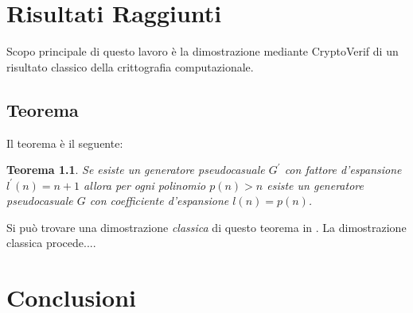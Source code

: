 \documentclass[a4paper,openright,twoside,12pt]{report}
\newtheorem{teorema}{Teorema}[chapter]
\begin{document}
\chapter{Risultati Raggiunti}
Scopo principale di questo lavoro \`e la dimostrazione mediante CryptoVerif di un risultato classico della crittografia computazionale.
\section{Teorema}
Il teorema \`e il seguente:\\
\begin{teorema}
Se esiste un generatore pseudocasuale $G^{'}$ con fattore d'espansione $l^{'}(n)=n+1$ allora per ogni polinomio $p(n)>n$ esiste un generatore pseudocasuale $G$ con coefficiente d'espansione
$l(n)=p(n)$.
\end{teorema}

Si pu\`o trovare una dimostrazione \emph{classica} di questo teorema in \cite{1206501}. La dimostrazione classica procede....

\chapter{Conclusioni}
\lhead[\fancyplain{}{\bfseries\thepage}]{\fancyplain{}{\bfseries\rightmark}}
	
		
\end{document}
